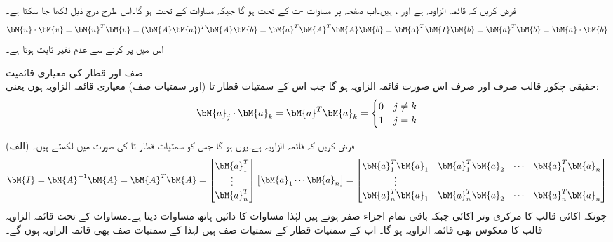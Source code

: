 فرض کریں کہ  قائمہ الزاویہ ہے اور  ،  ہیں۔اب صفحہ  پر مساوات -ت کے تحت  ہو گا جبکہ مساوات  کے تحت  ہو گا۔اس طرح درج ذیل لکھا جا سکتا ہے۔
\begin{align}
\bM{u}\cdot \bM{v}=\bM{u}^T\bM{v}=(\bM{A}\bM{a})^T\bM{A}\bM{b}=\bM{a}^T\bM{A}^T\bM{A}\bM{b}=\bM{a}^T\bM{I}\bM{b}=\bM{a}^T\bM{b}=\bM{a}\cdot\bM{b}
\end{align} 
اس میں  پر کرنے سے  عدم تغیر ثابت ہوتا ہے۔

\quad صف اور قطار کی معیاری قائمیت\\
حقیقی چکور قالب صرف اور صرف اس صورت قائمہ الزاویہ ہو گا جب اس کے سمتیات قطار  تا  (اور سمتیات صف) معیاری قائمہ الزاویہ ہوں یعنی:
\begin{align}\label{مساوات_آئگنی_معیاری_قائمیت_الف}
\bM{a}_j\cdot\bM{a}_k=\bM{a}^T\bM{a}_k=
\begin{cases}
0& j\ne k\\
1&j=k
\end{cases}
\end{align}

(الف) فرض کریں کہ  قائمہ الزاویہ ہے۔یوں  ہو گا جس کو سمتیات قطار  تا  کی صورت میں لکھتے ہیں۔
\begin{align}\label{مساوات_آئگنی_معیاری_قائمیت_ب}
\bM{I}=\bM{A}^{-1}\bM{A}=\bM{A}^T\bM{A}=\begin{bmatrix}\bM{a}_1^T\\  \vdots \\ \bM{a}_n^T  \end{bmatrix}\begin{bmatrix} \bM{a}_1 \cdots \bM{a}_n \end{bmatrix}=
\begin{bmatrix} \bM{a}_1^T\bM{a}_1&\bM{a}_1^T\bM{a}_2&\cdots&\bM{a}_1^T\bM{a}_n\\  \vdots \\ 
\bM{a}_n^T\bM{a}_1&\bM{a}_n^T\bM{a}_2&\cdots&\bM{a}_n^T\bM{a}_n \end{bmatrix}
\end{align}
چونکہ  اکائی قالب  کا مرکزی وتر اکائی جبکہ باقی تمام اجزاء صفر ہوتے ہیں لہٰذا مساوات  کا دائیں ہاتھ  مساوات  دیتا ہے۔مساوات  کے تحت قائمہ الزاویہ قالب کا معکوس بھی قائمہ الزاویہ ہو گا۔ اب  کے سمتیات قطار  کے سمتیات صف ہیں لہٰذا  کے سمتیات صف بھی قائمہ الزاویہ ہوں گے۔ 

